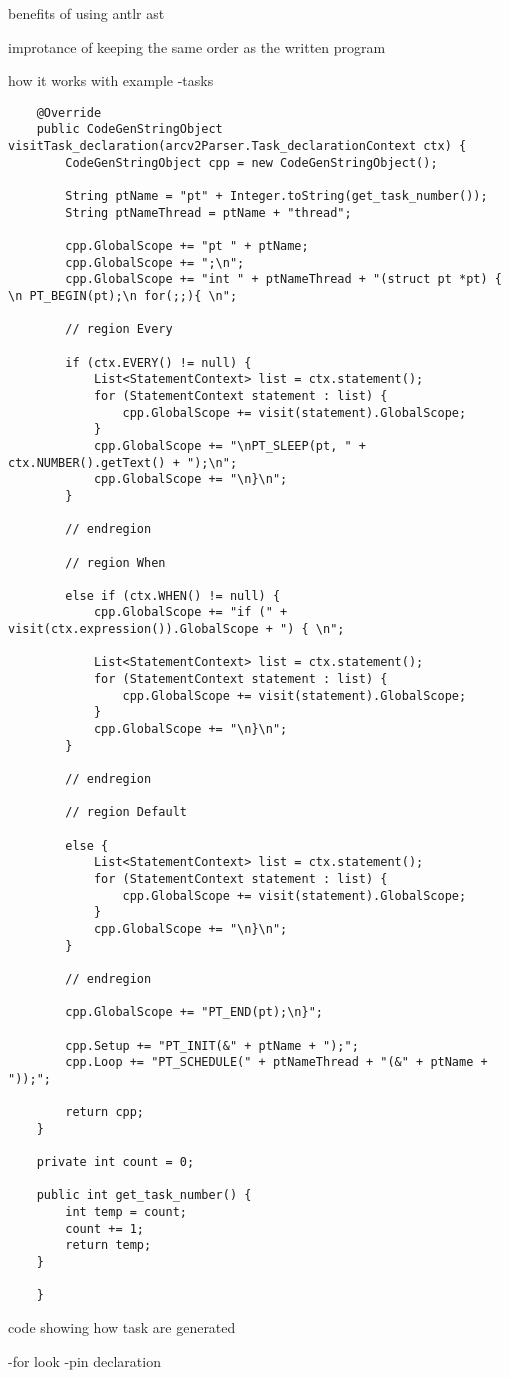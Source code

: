 benefits of using antlr ast




improtance of keeping the same order as the written program

how it works with example
    -tasks
    \begin{listing}[htb!]
        \begin{verbatim}
    @Override
    public CodeGenStringObject visitTask_declaration(arcv2Parser.Task_declarationContext ctx) {
        CodeGenStringObject cpp = new CodeGenStringObject();

        String ptName = "pt" + Integer.toString(get_task_number());
        String ptNameThread = ptName + "thread";

        cpp.GlobalScope += "pt " + ptName;
        cpp.GlobalScope += ";\n";
        cpp.GlobalScope += "int " + ptNameThread + "(struct pt *pt) { \n PT_BEGIN(pt);\n for(;;){ \n";

        // region Every

        if (ctx.EVERY() != null) {
            List<StatementContext> list = ctx.statement();
            for (StatementContext statement : list) {
                cpp.GlobalScope += visit(statement).GlobalScope;
            }
            cpp.GlobalScope += "\nPT_SLEEP(pt, " + ctx.NUMBER().getText() + ");\n";
            cpp.GlobalScope += "\n}\n";
        }

        // endregion

        // region When

        else if (ctx.WHEN() != null) {
            cpp.GlobalScope += "if (" + visit(ctx.expression()).GlobalScope + ") { \n";

            List<StatementContext> list = ctx.statement();
            for (StatementContext statement : list) {
                cpp.GlobalScope += visit(statement).GlobalScope;
            }
            cpp.GlobalScope += "\n}\n";
        }

        // endregion

        // region Default

        else {
            List<StatementContext> list = ctx.statement();
            for (StatementContext statement : list) {
                cpp.GlobalScope += visit(statement).GlobalScope;
            }
            cpp.GlobalScope += "\n}\n";
        }

        // endregion

        cpp.GlobalScope += "PT_END(pt);\n}";

        cpp.Setup += "PT_INIT(&" + ptName + ");";
        cpp.Loop += "PT_SCHEDULE(" + ptNameThread + "(&" + ptName + "));";

        return cpp;
    }

    private int count = 0;

    public int get_task_number() {
        int temp = count;
        count += 1;
        return temp;
    }

    }
        \end{verbatim}
        \caption{code showing how task are generated}
        \label{lst:code gen task}
    \end{listing}



    -for look
    -pin declaration